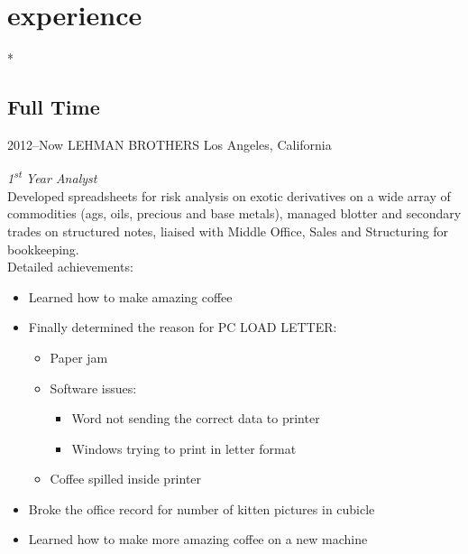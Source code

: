 \documentclass[]{friggeri-cv} %
\begin{document}

\section{experience}

\/*

\subsection{Full Time}

\begin{entrylist}


\entry
{2012--Now}
{LEHMAN BROTHERS}
{Los Angeles, California}
{\emph{1\textsuperscript{st} Year Analyst} \\
Developed spreadsheets for risk analysis on exotic derivatives on a wide array of commodities (ags, oils, precious and base metals), managed blotter and secondary trades on structured notes, liaised with Middle Office, Sales and Structuring for bookkeeping. \\
Detailed achievements:
\begin{itemize}
\item Learned how to make amazing coffee
\item Finally determined the reason for \textsc{PC LOAD LETTER}:
\begin{itemize}
\item Paper jam
\item Software issues:
\begin{itemize}
\item Word not sending the correct data to printer
\item Windows trying to print in letter format
\end{itemize}
\item Coffee spilled inside printer
\end{itemize}
\item Broke the office record for number of kitten pictures in cubicle
\item Learned how to make more amazing coffee on a new machine
\end{itemize}}


\end{entrylist}
\end{document}
